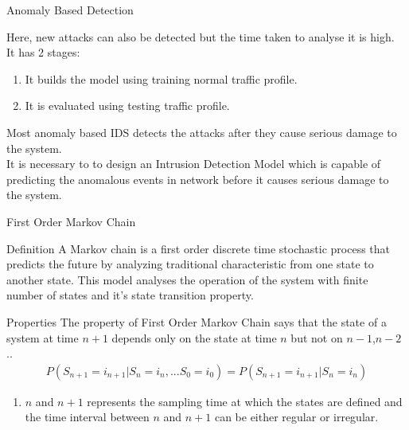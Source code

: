 \documentclass{beamer}
\begin{document}
\begin{frame}{Anomaly Based Detection}

    Here, new attacks can also be detected but the time taken to analyse it is high.\\
    It has 2 stages:
\begin{enumerate}
    \item It builds the model using training normal traffic profile.
    \item It is evaluated using testing traffic profile.
\end{enumerate}
Most anomaly based IDS detects the attacks after they cause serious damage to the system.\\
It is necessary to to design an Intrusion Detection Model which is capable of predicting the anomalous events in network before it causes serious damage to the system. 
\end{frame}
\begin{frame}{First Order Markov Chain}
\begin{block}{Definition}
A Markov chain is a first order discrete time stochastic process that predicts the future by analyzing traditional characteristic from one state to another state. This model analyses the operation of the system with finite number of states and it's state transition property.
\end{block}
\begin{block}{Properties}
The property of First Order Markov Chain says that the state of a system at time $n+1$ depends only on the state at time $n$ but not on $n-1$,$n-2$..
\begin{align}
    P(S_{n+1}=i_{n+1}|S_n=i_n,...S_0=i_0)=P(S_{n+1}=i_{n+1}|S_n=i_n)
\end{align}
\begin{enumerate}
    \item $n$ and $n+1$ represents the sampling time at which the states are defined and the time interval between $n$ and $n+1$ can be either regular or irregular.
\end{enumerate}
\end{block}
\end{frame}
\end{document}
